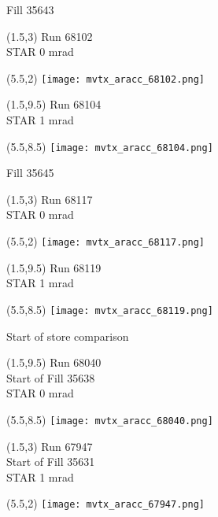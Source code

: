 \documentclass[aspectratio=169,compress,10pt]{beamer} %
\begin{document}
\begin{frame}{Fill 35643}
\begin{textblock}{3.5}(1.5,3)
Run 68102 \\
STAR 0 mrad
\end{textblock}
\begin{textblock}{10}(5.5,2)
\texttt{[image: mvtx\_aracc\_68102.png]}
\end{textblock}
\begin{textblock}{3.5}(1.5,9.5)
Run 68104 \\
STAR 1 mrad
\end{textblock}
\begin{textblock}{10}(5.5,8.5)
\texttt{[image: mvtx\_aracc\_68104.png]}
\end{textblock}
\end{frame}



\begin{frame}{Fill 35645}
\begin{textblock}{3.5}(1.5,3)
Run 68117 \\
STAR 0 mrad
\end{textblock}
\begin{textblock}{10}(5.5,2)
\texttt{[image: mvtx\_aracc\_68117.png]}
\end{textblock}
\begin{textblock}{3.5}(1.5,9.5)
Run 68119 \\
STAR 1 mrad
\end{textblock}
\begin{textblock}{10}(5.5,8.5)
\texttt{[image: mvtx\_aracc\_68119.png]}
\end{textblock}
\end{frame}



\begin{frame}{Start of store comparison}
\begin{textblock}{3.5}(1.5,9.5)
Run 68040 \\
Start of Fill 35638 \\
STAR 0 mrad
\end{textblock}
\begin{textblock}{10}(5.5,8.5)
\texttt{[image: mvtx\_aracc\_68040.png]}
\end{textblock}
\begin{textblock}{3.5}(1.5,3)
Run 67947 \\
Start of Fill 35631 \\
STAR 1 mrad
\end{textblock}
\begin{textblock}{10}(5.5,2)
\texttt{[image: mvtx\_aracc\_67947.png]}
\end{textblock}
\end{frame}
\end{document}
